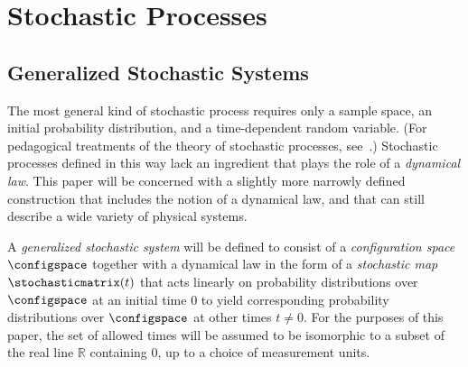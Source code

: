 \documentclass[12pt,english,prl,superscriptaddress,nobibnotes,nofootinbib]{revtex4-2}
\let\originalleft\left
\let\originalright\right
\renewcommand{\left}{\mathopen{}\mathclose\bgroup\originalleft}
\renewcommand{\right}{\aftergroup\egroup\originalright}
\begin{document}
\section{Stochastic Processes\label{sec:Stochastic-Processes}}

\subsection{Generalized Stochastic Systems\label{subsec:Generalized-Stochastic-Systems}}

The most general kind of stochastic process requires only a sample
space, an initial probability distribution, and a time-dependent random
variable. (For pedagogical treatments of the theory of stochastic
processes, see~\citep{Rosenblatt:1962rp,Parzen:1962sp,Doob:1990sp,Ross:1995sp}.)
Stochastic processes defined in this way lack an ingredient that plays
the role of a \emph{dynamical law}. This paper will be concerned
with a slightly more narrowly defined construction that includes the
notion of a dynamical law, and that can still describe a wide variety
of physical systems.

A \emph{generalized stochastic system} will be defined to consist
of a \emph{configuration space} $\configspace$ together with a dynamical
law in the form of a \emph{stochastic map} $\stochasticmatrix\left(t\right)$
that acts linearly on probability distributions over $\configspace$
at an initial time $0$ to yield corresponding probability distributions
over $\configspace$ at other times $t\ne0$. For the purposes of
this paper, the set of allowed times will be assumed to be isomorphic
to a subset of the real line $\mathbb{R}$ containing $0$, up to
a choice of measurement units.
\end{document}
